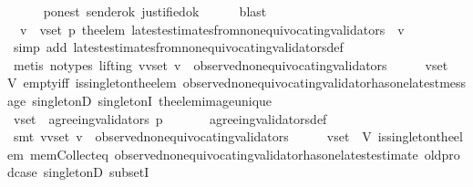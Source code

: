 \begin{isabellebody}
\ \ \ \ \isamarkupfalse%
\ p{\isacharunderscore}on{\isacharunderscore}est\ sender{\isacharunderscore}ok\ justified{\isacharunderscore}ok\isanewline
\ \ \ \ \isamarkupfalse%
\ blast\ \ \ \isanewline
\ \ \isamarkupfalse%
\ \isamarkupfalse%
\ {\isachardoublequoteopen}{\isasymforall}\ v\ {\isasymin}\ v{\isacharunderscore}set{\isachardot}\ p\ {\isacharparenleft}the{\isacharunderscore}elem\ {\isacharparenleft}latest{\isacharunderscore}estimates{\isacharunderscore}from{\isacharunderscore}non{\isacharunderscore}equivocating{\isacharunderscore}validators\ {\isasymsigma}\ v{\isacharparenright}{\isacharparenright}{\isachardoublequoteclose}\isanewline
\ \ \ \ \isamarkupfalse%
\ {\isacharparenleft}simp\ add{\isacharcolon}\ latest{\isacharunderscore}estimates{\isacharunderscore}from{\isacharunderscore}non{\isacharunderscore}equivocating{\isacharunderscore}validators{\isacharunderscore}def{\isacharparenright}\isanewline
\ \ \ \ \isamarkupfalse%
\ {\isacharparenleft}metis\ {\isacharparenleft}no{\isacharunderscore}types{\isacharcomma}\ lifting{\isacharparenright}\ {\isacartoucheopen}{\isasymforall}v{\isasymin}v{\isacharunderscore}set{\isachardot}\ v\ {\isasymin}\ observed{\isacharunderscore}non{\isacharunderscore}equivocating{\isacharunderscore}validators\ {\isasymsigma}{\isacartoucheclose}\ {\isacartoucheopen}{\isasymsigma}\ {\isasymin}\ {\isasymSigma}\ {\isasymand}\ v{\isacharunderscore}set\ {\isasymsubseteq}\ V{\isacartoucheclose}\ empty{\isacharunderscore}iff\ is{\isacharunderscore}singleton{\isacharunderscore}the{\isacharunderscore}elem\ observed{\isacharunderscore}non{\isacharunderscore}equivocating{\isacharunderscore}validator{\isacharunderscore}has{\isacharunderscore}one{\isacharunderscore}latest{\isacharunderscore}message\ singletonD\ singletonI\ the{\isacharunderscore}elem{\isacharunderscore}image{\isacharunderscore}unique{\isacharparenright}\ \ \isanewline
\ \ \isamarkupfalse%
\ \isamarkupfalse%
\ {\isachardoublequoteopen}v{\isacharunderscore}set\ {\isasymsubseteq}\ agreeing{\isacharunderscore}validators\ {\isacharparenleft}p{\isacharcomma}\ {\isasymsigma}{\isacharparenright}{\isachardoublequoteclose}\isanewline
\ \ \ \ \isamarkupfalse%
\ agreeing{\isacharunderscore}validators{\isacharunderscore}def\isanewline
\ \ \ \ \isamarkupfalse%
\ {\isacharparenleft}smt\ {\isacartoucheopen}{\isasymforall}v{\isasymin}v{\isacharunderscore}set{\isachardot}\ v\ {\isasymin}\ observed{\isacharunderscore}non{\isacharunderscore}equivocating{\isacharunderscore}validators\ {\isasymsigma}{\isacartoucheclose}\ {\isacartoucheopen}{\isasymsigma}\ {\isasymin}\ {\isasymSigma}\ {\isasymand}\ v{\isacharunderscore}set\ {\isasymsubseteq}\ V{\isacartoucheclose}\ is{\isacharunderscore}singleton{\isacharunderscore}the{\isacharunderscore}elem\ mem{\isacharunderscore}Collect{\isacharunderscore}eq\ observed{\isacharunderscore}non{\isacharunderscore}equivocating{\isacharunderscore}validator{\isacharunderscore}has{\isacharunderscore}one{\isacharunderscore}latest{\isacharunderscore}estimate\ old{\isachardot}prod{\isachardot}case\ singletonD\ subsetI{\isacharparenright}\isanewline

\end{isabellebody}
